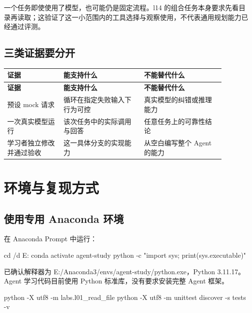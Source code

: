 一个任务即使使用了模型，也可能仍是固定流程。l14 的组合任务本身要求先看目录再读取；这验证了这一小范围内的工具选择与观察使用，不代表通用规划能力已经通过评测。

\subsection{三类证据要分开}

{\small\setlength{\tabcolsep}{4pt}
\renewcommand{\arraystretch}{1.25}
\begin{longtable}{>{\raggedright\arraybackslash}p{0.23\linewidth}>{\raggedright\arraybackslash}p{0.33\linewidth}>{\raggedright\arraybackslash}p{0.33\linewidth}}
\toprule
\textbf{证据} & \textbf{能支持什么} & \textbf{不能替代什么} \\
\midrule\endfirsthead
\toprule
\textbf{证据} & \textbf{能支持什么} & \textbf{不能替代什么} \\
\midrule\endhead
\bottomrule\endfoot
预设 mock 请求 & 循环在指定失败输入下行为可控 & 真实模型的纠错或推理能力 \\
一次真实模型运行 & 该次任务中的实际调用与回答 & 任意任务上的可靠性结论 \\
学习者独立修改并通过验收 & 这一具体分支的实现能力 & 从空白编写整个 Agent 的能力 \\
\end{longtable}}

\section{环境与复现方式}

\subsection{使用专用 Anaconda 环境}

在 Anaconda Prompt 中运行：

\begin{Code}
cd /d E:\study\agent
conda activate agent-study
python -c "import sys; print(sys.executable)"
\end{Code}

已确认解释器为 E:/Anaconda3/envs/agent-study/python.exe，Python 3.11.17。Agent 学习代码目前使用 Python 标准库，没有要求安装完整 Agent 框架。

\begin{Code}
python -X utf8 -m labs.l01_read_file
python -X utf8 -m unittest discover -s tests -v
\end{Code}

